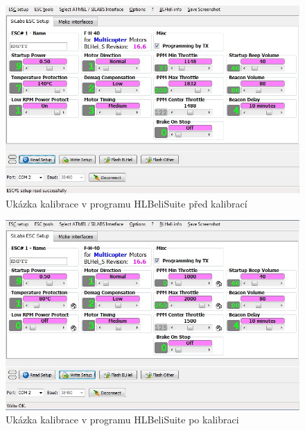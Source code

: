 \begin{figure}[H]
	\centering
	\includegraphics[width=12cm]{pictures/esc_calib5.jpg}
	\caption{Ukázka kalibrace v programu HLBeliSuite před kalibrací}
\end{figure}

\begin{figure}[H]
	\centering
	\includegraphics[width=12cm]{pictures/esc_calib6.jpg}
	\caption{Ukázka kalibrace v programu HLBeliSuite po kalibraci}
\end{figure}

